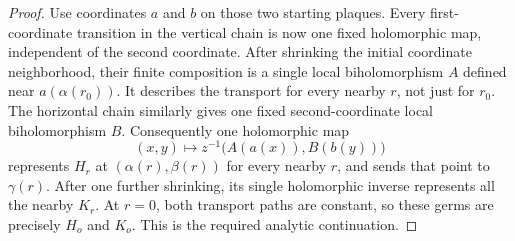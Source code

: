 \begin{proof}
Use coordinates \(a\) and \(b\) on those two starting plaques.
Every first-coordinate transition in the vertical chain is now one
fixed holomorphic map, independent of the second coordinate. After
shrinking the initial coordinate neighborhood, their finite composition
is a single local biholomorphism \(A\) defined near
\(a(\alpha(r_0))\). It describes the transport for every nearby
\(r\), not just for \(r_0\). The horizontal chain similarly gives
one fixed second-coordinate local biholomorphism \(B\). Consequently
one holomorphic map
\begin{equation}\label{eq:fixed-transport}
 (x,y)\longmapsto
 z^{-1}\bigl(A(a(x)),B(b(y))\bigr)
\end{equation}
represents \(H_r\) at \((\alpha(r),\beta(r))\) for every nearby
\(r\), and sends that point to \(\gamma(r)\). After one further
shrinking, its single holomorphic inverse represents all the nearby
\(K_r\). At \(r=0\), both transport paths are constant, so these
germs are precisely \(H_o\) and \(K_o\). This is the required
analytic continuation.
\end{proof}

